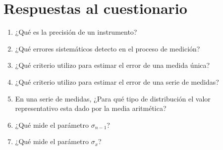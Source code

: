 \documentclass[letter,twoside,11pt]{article}
\begin{document}
\section{Respuestas al cuestionario}
\begin{enumerate}
    \item ¿Qué es la precisión de un instrumento?
        \vspace{2.0cm}
    \item ¿Qué errores sistemáticos detecto en el proceso de medición?
        \vspace{2.0cm}
    \item ¿Qué criterio utilizo para estimar el error de una medida única?
        \vspace{2.0cm}
    \item ¿Qué criterio utilizo para estimar el error de una serie de medidas?
        \vspace{2.0cm}
    \item En una serie de medidas, ¿Para qué tipo de distribución el valor
    representativo esta dado por la media aritmética?
        \vspace{2.0cm}
    \item ¿Qué mide el parámetro $\sigma_{n-1}$?
        \vspace{2.0cm}
    \item ¿Qué mide el parámetro $\sigma_x$?
        \vspace{2.0cm}
\end{enumerate}
\end{document}
